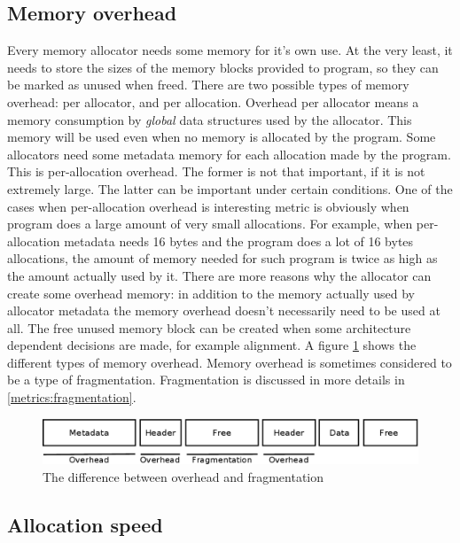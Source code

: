 \subsection{Memory overhead}
\label{metrics:overhead}
Every memory allocator needs some memory for it's own use. At the very least, it needs to store the sizes of the memory blocks provided to program, so they can be marked as unused when freed. There are two possible types of memory overhead: per allocator, and per allocation. Overhead per allocator means a memory consumption by {\em global} data structures used by the allocator. This memory will be used even when no memory is allocated by the program. Some allocators need some metadata memory for each allocation made by the program. This is per-allocation overhead. The former is not that important, if it is not extremely large. The latter can be important under certain conditions. One of the cases when per-allocation overhead is interesting metric is obviously when program does a large amount of very small allocations. For example, when per-allocation metadata needs 16 bytes and the program does a lot of 16 bytes allocations, the amount of memory needed for such program is twice as high as the amount actually used by it. There are more reasons why the allocator can create some overhead memory: in addition to the memory actually used by allocator metadata the memory overhead doesn't necessarily need to be used at all. The free unused memory block can be created when some architecture dependent decisions are made, for example alignment. A figure \ref{fig:overhead} shows the different types of memory overhead. Memory overhead is sometimes considered to be a type of fragmentation. Fragmentation is discussed in more details in \ref{metrics:fragmentation}.
\begin{figure}[h]
\begin{center}
\includegraphics[width=1.0\textwidth,keepaspectratio]{fig/frags}
\end{center}
\caption{The difference between overhead and fragmentation}
\label{fig:overhead}
\end{figure}

\subsection{Allocation speed}


